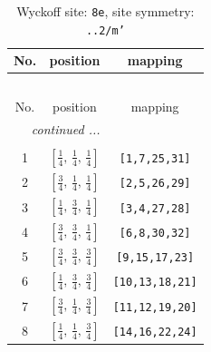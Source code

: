 \documentclass[fleqn,8pt]{jsarticle}
\begin{document}
\renewcommand{\arraystretch}{1.2}
\begin{longtable}{ccc}
\caption{Wyckoff site: {\tt 8e}, site symmetry: {\tt ..2/m'}}
 \\
 \hline \hline
No. & position & mapping \\ \hline \endfirsthead

\multicolumn{2}{l}{\tablename\ \thetable{}} \\
 \hline \hline
No. & position & mapping \\ \hline \endhead

 \hline \hline
\multicolumn{2}{r}{\footnotesize\it continued ...} \\ \endfoot

 \hline \hline
\multicolumn{2}{r}{} \\ \endlastfoot

1 & $\left[ \frac{1}{4},\, \frac{1}{4},\, \frac{1}{4} \right]$ & {\tt [1,7,25,31]} \\ \hline
2 & $\left[ \frac{3}{4},\, \frac{1}{4},\, \frac{1}{4} \right]$ & {\tt [2,5,26,29]} \\ \hline
3 & $\left[ \frac{1}{4},\, \frac{3}{4},\, \frac{1}{4} \right]$ & {\tt [3,4,27,28]} \\ \hline
4 & $\left[ \frac{3}{4},\, \frac{3}{4},\, \frac{1}{4} \right]$ & {\tt [6,8,30,32]} \\ \hline
5 & $\left[ \frac{3}{4},\, \frac{3}{4},\, \frac{3}{4} \right]$ & {\tt [9,15,17,23]} \\ \hline
6 & $\left[ \frac{1}{4},\, \frac{3}{4},\, \frac{3}{4} \right]$ & {\tt [10,13,18,21]} \\ \hline
7 & $\left[ \frac{3}{4},\, \frac{1}{4},\, \frac{3}{4} \right]$ & {\tt [11,12,19,20]} \\ \hline
8 & $\left[ \frac{1}{4},\, \frac{1}{4},\, \frac{3}{4} \right]$ & {\tt [14,16,22,24]} \\
\end{longtable}
\renewcommand{\arraystretch}{1.2}
\end{document}
